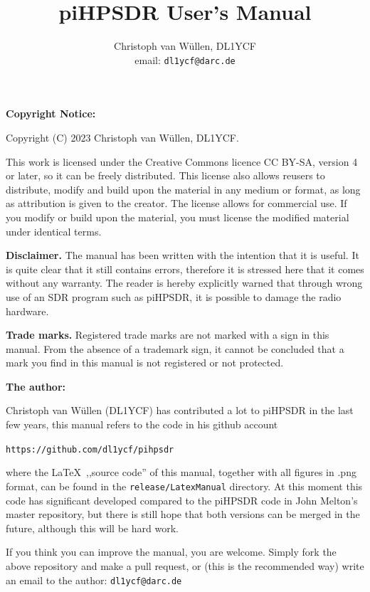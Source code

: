 \documentclass[12pt]{book}
\begin{document}
\frontmatter
\title{
piHPSDR User's Manual
}
\author{
Christoph van W\"ullen, DL1YCF \\
email: \texttt{dl1ycf@darc.de}
}

%
\maketitle
\textbf{Copyright Notice:}

Copyright (C) 2023 Christoph van W\"ullen, DL1YCF.

This work is licensed under
the Creative Commons licence CC BY-SA, version 4 or later, so it can be freely distributed.
 This license also allows reusers to distribute, modify and build upon the material in any medium or format,
as long as attribution is given to the creator. The license allows for commercial use.
If you modify or build upon the material, you must license the modified material under identical terms.

\textbf{Disclaimer.} The manual has been written with the intention that it is useful. It is quite clear that it
still contains errors, therefore it is stressed here that it comes without any warranty. The reader is hereby
explicitly warned that through wrong use of an SDR program such as piHPSDR, it is possible to damage the
radio hardware.

\textbf{Trade marks.} Registered trade marks are not marked with a sign in this manual. From the absence of a
trademark sign, it cannot be concluded that a mark you find in this manual is not registered or not protected.

\bigskip
\textbf{The author:}

Christoph van W\"ullen (DL1YCF) has contributed a lot to piHPSDR in the last few years, this manual refers
to the code in his github account

\texttt{https://github.com/dl1ycf/pihpsdr}

where the \LaTeX\   ,,source code'' of this manual, together with all figures in .png format, can be found
in the \texttt{release/LatexManual} directory. At this moment this code has significant developed compared
to the piHPSDR code in John Melton's master repository, but there is still hope that both versions can
be merged in  the  future, although this  will  be hard  work.

If you think you can improve the manual, you are welcome.
Simply fork the above repository and make a pull request, or (this is the recommended way) write an
email to the author: \texttt{dl1ycf@darc.de}
\end{document}
